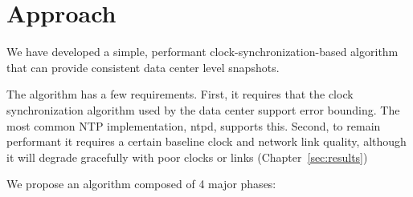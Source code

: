 \chapter{Approach}
\label{sec:approach}

We have developed a simple, performant clock-synchronization-based
algorithm that can provide consistent data center level snapshots.

The algorithm has a few requirements. First, it requires that the
clock synchronization algorithm used by the data center support error
bounding. The most common NTP implementation, ntpd, supports
this. Second, to remain performant it requires a certain baseline
clock and network link quality, although it will degrade gracefully
with poor clocks or links (Chapter~\ref{sec:results})

We propose an algorithm composed of 4 major phases:

